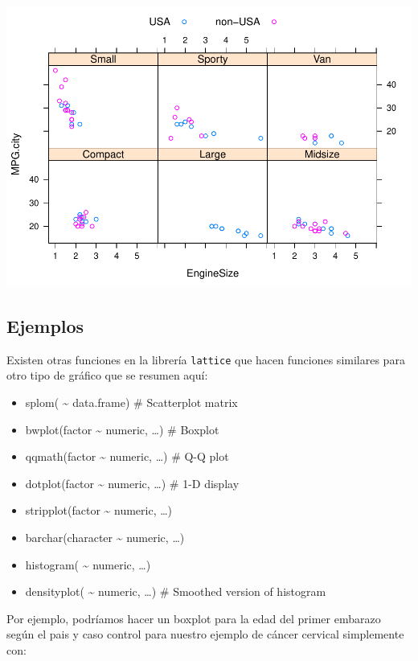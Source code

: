 \documentclass[
]{book}
\providecommand{\tightlist}{%
  \setlength{\itemsep}{0pt}\setlength{\parskip}{0pt}}
\begin{document}
\includegraphics{fig/unnamed-chunk-114-1.pdf}

\hypertarget{ejemplos-2}{%
\subsection*{Ejemplos}\label{ejemplos-2}}

Existen otras funciones en la librería \texttt{lattice} que hacen funciones similares para otro tipo de gráfico que se resumen aquí:

\begin{itemize}
\tightlist
\item
  splom( \textasciitilde{} data.frame) \# Scatterplot matrix
\item
  bwplot(factor \textasciitilde{} numeric, \ldots) \# Boxplot
\item
  qqmath(factor \textasciitilde{} numeric, \ldots) \# Q-Q plot
\item
  dotplot(factor \textasciitilde{} numeric, \ldots) \# 1-D display
\item
  stripplot(factor \textasciitilde{} numeric, \ldots)
\item
  barchar(character \textasciitilde{} numeric, \ldots)
\item
  histogram( \textasciitilde{} numeric, \ldots)
\item
  densityplot( \textasciitilde{} numeric, \ldots) \# Smoothed version of histogram
\end{itemize}

Por ejemplo, podríamos hacer un boxplot para la edad del primer embarazo según el pais y caso control para nuestro ejemplo de cáncer cervical simplemente con:
\end{document}
